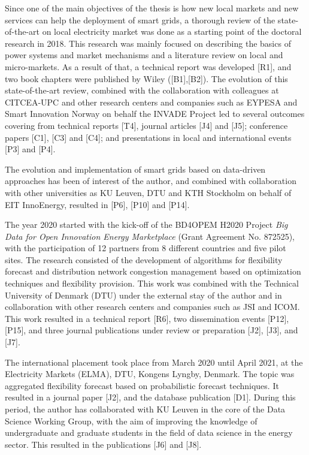 Since one of the main objectives of the thesis is how new local markets and new services can help the deployment of smart grids, a thorough review of the state-of-the-art on local electricity market was done as a starting point of the doctoral research in 2018. This research was mainly focused on describing the basics of power systems and market mechanisms and a literature review on local and micro-markets. As a result of that, a technical report was developed [R1], and two book chapters were published by Wiley ([B1],[B2]).  The evolution of this state-of-the-art review, combined with the collaboration with colleagues at CITCEA-UPC and other research centers and companies such as EYPESA and Smart Innovation Norway on behalf the INVADE Project led to several outcomes covering from technical reports [T4], journal articles [J4] and [J5]; conference papers [C1], [C3] and [C4]; and presentations in local and international events [P3] and [P4].  

The evolution and implementation of smart grids based on data-driven approaches has been of interest of the author, and combined with collaboration with other universities as KU Leuven, DTU and KTH Stockholm on behalf of EIT InnoEnergy, resulted in [P6], [P10] and [P14]. 

The year 2020 started with the kick-off of the BD4OPEM H2020 Project \textit{Big Data for Open Innovation Energy Marketplace} (Grant Agreement No. 872525), with the participation of 12 partners from 8 different countries and five pilot sites. The research consisted of the development of algorithms for flexibility forecast and distribution network congestion management based on optimization techniques and flexibility provision. This work was combined with the Technical University of Denmark (DTU) under the external stay of the author and in collaboration with other research centers and companies such as JSI and ICOM. This work resulted in a technical report [R6], two dissemination events [P12], [P15], and three journal publications under review or preparation [J2], [J3], and [J7].

The international placement took place from March 2020 until April 2021, at the Electricity Markets (ELMA), DTU, Kongens Lyngby, Denmark. The topic was aggregated flexibility forecast based on probabilistic forecast techniques. It resulted in a journal paper [J2], and the database publication [D1]. During this period, the author has collaborated with KU Leuven in the core of the Data Science Working Group, with the aim of improving the knowledge of undergraduate and graduate students in the field of data science in the energy sector. This resulted in the publications [J6] and [J8]. 

